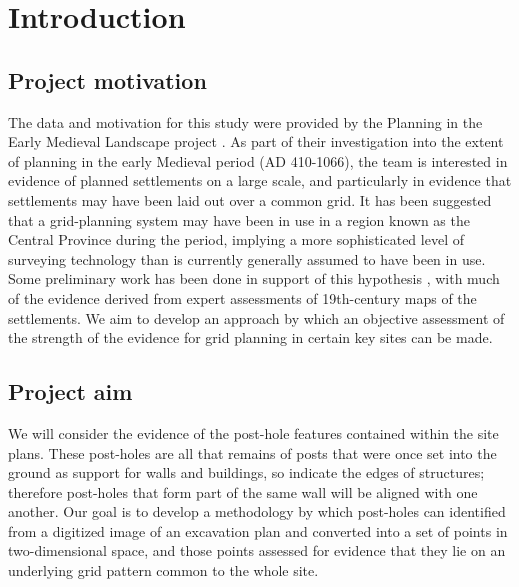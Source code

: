 \documentclass[../../ArchStats.tex]{subfiles}
\begin{document}
\section{Introduction}

\subsection{Project motivation}
The data and motivation for this study were provided by the Planning in the Early Medieval Landscape project \cite{PEML}. As part of their investigation into the extent of planning in the early Medieval period (AD 410-1066), the team is interested in evidence of planned settlements on  a large scale, and particularly in evidence that settlements may have been laid out over a common grid. It has been suggested that a grid-planning system may have been in use in a region known as the Central Province during the period, implying a more sophisticated level of surveying technology than is currently generally assumed to have been in use. Some preliminary work has been done in support of this hypothesis \cite{Blair2013}, with much of the evidence derived from expert assessments of 19th-century maps of the settlements. We aim to develop an approach by which an objective assessment of the strength of the evidence for grid planning in certain key sites can be made.

\subsection{Project aim}

We will consider the evidence of the post-hole features contained within the site plans. These post-holes are all that remains of posts that were once set into the ground as support for walls and buildings, so indicate the edges of structures; therefore post-holes that form part of the same wall will be aligned with one another. Our goal is to develop a methodology by which post-holes can identified from  a digitized image of an excavation plan and converted into a set of points in two-dimensional space, and those points assessed for evidence that they lie on an underlying grid pattern common to the whole site. 
\end{document}
